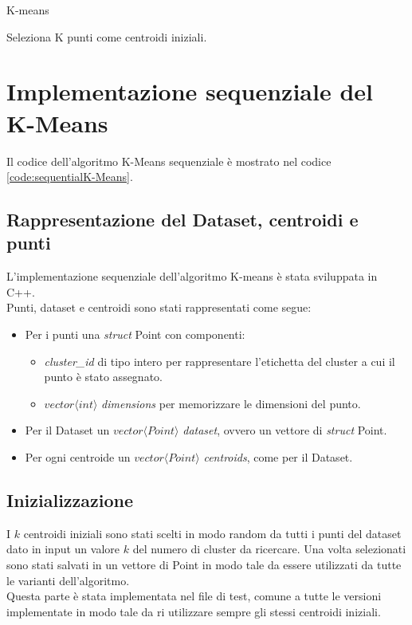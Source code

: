 \documentclass[10pt,twocolumn,letterpaper]{article}
\begin{document}
\begin{algorithm}[h]
	\SetAlgoLined  
	\DontPrintSemicolon
	\caption{K-means}
	\label{alg:kmeans}
	Seleziona K punti come centroidi iniziali.\;
\end{algorithm}


\section{Implementazione sequenziale del K-Means}
Il codice dell'algoritmo K-Means sequenziale è mostrato nel codice \ref{code:sequentialK-Means}.
\subsection{Rappresentazione del Dataset, centroidi e punti}
L'implementazione sequenziale dell'algoritmo K-means è stata sviluppata in C++.\\
Punti, dataset e centroidi sono stati rappresentati come segue:
\begin{itemize}
	\item Per i punti una \textit{struct} Point con componenti:
	\begin{itemize}
		\item \textit{cluster\_id} di tipo intero per rappresentare l'etichetta del cluster a cui il punto è stato assegnato.
		\item $vector \langle int \rangle$ \textit{dimensions} per memorizzare le dimensioni del punto.
	\end{itemize}  
	
	\item Per il Dataset un $vector \langle Point \rangle$ \textit{dataset}, ovvero un vettore di \textit{struct} Point.
	\item Per ogni centroide un $vector \langle Point \rangle$ \textit{centroids}, come per il Dataset.
\end{itemize}

\subsection{Inizializzazione}
I $k$ centroidi iniziali sono stati scelti in modo random da tutti i punti del dataset dato in input un valore $k$ del numero di cluster da ricercare. Una volta selezionati sono stati salvati in un vettore di Point in modo tale da essere utilizzati da tutte le varianti dell'algoritmo.\\
Questa parte è stata implementata nel file di test, comune a tutte le versioni implementate in modo tale da ri utilizzare sempre gli stessi centroidi iniziali.
\end{document}
